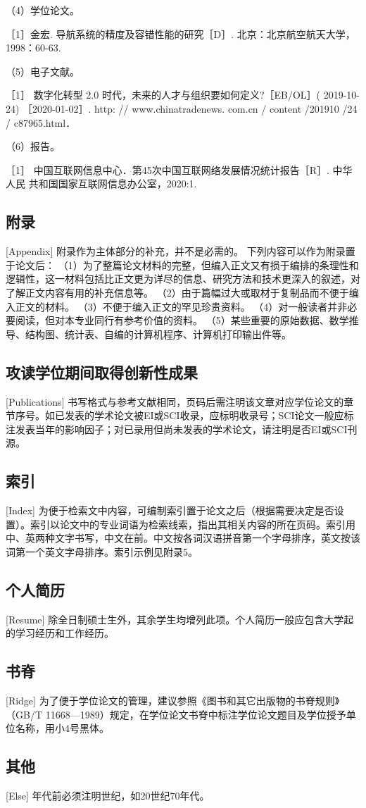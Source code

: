 （4）学位论文。

［1］金宏. 导航系统的精度及容错性能的研究［D］. 北京：北京航空航天大学，1998：60-63.

（5）电子文献。

［1］ 数字化转型 2.0 时代，未来的人才与组织要如何定义?［EB/OL］( 2019-10-24) ［2020-01-02］. http: // www.chinatradenews. com.cn / content /201910 /24 / c87965.html．

（6）报告。

［1］  中国互联网信息中心．第45次中国互联网络发展情况统计报告［R］. 中华人民 共和国国家互联网信息办公室，2020:1.

\subsection{附录}[Appendix]
附录作为主体部分的补充，并不是必需的。
下列内容可以作为附录置于论文后：
（1）为了整篇论文材料的完整，但编入正文又有损于编排的条理性和逻辑性，这一材料包括比正文更为详尽的信息、研究方法和技术更深入的叙述，对了解正文内容有用的补充信息等。
（2）由于篇幅过大或取材于复制品而不便于编入正文的材料。
（3）不便于编入正文的罕见珍贵资料。
（4）对一般读者并非必要阅读，但对本专业同行有参考价值的资料。
（5）某些重要的原始数据、数学推导、结构图、统计表、自编的计算机程序、计算机打印输出件等。

\subsection{攻读学位期间取得创新性成果}[Publications]
书写格式与参考文献相同，页码后需注明该文章对应学位论文的章节序号。如已发表的学术论文被EI或SCI收录，应标明收录号；SCI论文一般应标注发表当年的影响因子；对已录用但尚未发表的学术论文，请注明是否EI或SCI刊源。

\subsection{索引}[Index]
为便于检索文中内容，可编制索引置于论文之后（根据需要决定是否设置）。索引以论文中的专业词语为检索线索，指出其相关内容的所在页码。索引用中、英两种文字书写，中文在前。中文按各词汉语拼音第一个字母排序，英文按该词第一个英文字母排序。索引示例见附录5。
\subsection{个人简历}[Resume]
除全日制硕士生外，其余学生均增列此项。个人简历一般应包含大学起的学习经历和工作经历。

\subsection{书脊}[Ridge]
为了便于学位论文的管理，建议参照《图书和其它出版物的书脊规则》（GB/T 11668—1989）规定，在学位论文书脊中标注学位论文题目及学位授予单位名称，用小4号黑体。

\subsection{其他}[Else]
年代前必须注明世纪，如20世纪70年代。


